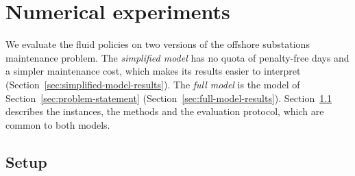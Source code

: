 \documentclass{article}
\begin{document}
\section{Numerical experiments}
\label{sec:numerics}

We evaluate the fluid policies on two versions of the offshore substations maintenance problem. The \emph{simplified
model} has no quota of penalty-free days and a simpler maintenance cost, which makes its results easier to interpret
(Section~\ref{sec:simplified-model-results}). The \emph{full model} is the model of
Section~\ref{sec:problem-statement} (Section~\ref{sec:full-model-results}). Section~\ref{sec:numerical-setup}
describes the instances, the methods and the evaluation protocol, which are common to both models.

\subsection{Setup}
\label{sec:numerical-setup}
\end{document}
